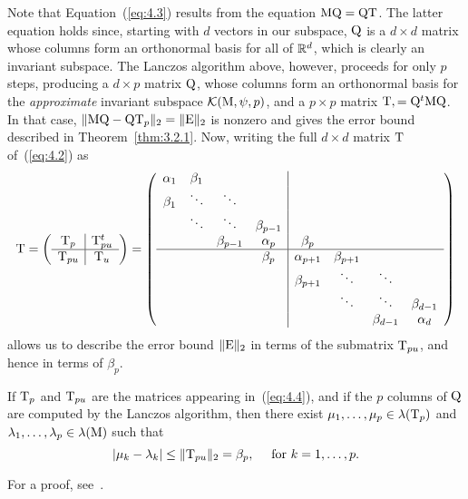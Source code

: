 Note that Equation~(\ref{eq:4.3}) results from the equation $\mathrm{M}\mathrm{Q} = \mathrm{Q}\mathrm{T}$. The latter equation holds
since, starting with $d$ vectors in our subspace, $\mathrm{Q}$ is a $d \times d$ matrix
whose columns form an orthonormal basis for all of $\mathbb{R}^d$, which is clearly an
invariant subspace. The Lanczos algorithm above, however, 
%
%
%
%
proceeds for only $p$ steps, producing a $d \times p$ matrix $\mathrm{Q}$, whose columns
form an orthonormal basis for the \emph{approximate} invariant subspace 
$\mathcal{K}(\mathrm{M}, \psi, p)$, and a $p \times p$ matrix $\mathrm{T}, = \mathrm{Q}^t\mathrm{M}\mathrm{Q}$. In that case,
$\|\mathrm{M}\mathrm{Q} - \mathrm{Q}\mathrm{T}_p\|_2 = \|\mathrm{E}\|_2$ is nonzero and gives the error bound described
in Theorem~\ref{thm:3.2.1}. Now, writing the full $d \times d$ matrix $\mathrm{T}$
of~(\ref{eq:4.2}) as
\begin{equation}
  \label{eq:4.4}
\mathrm{T} = 
\left( \begin{array}{c|c}
\mathrm{T}_p & \mathrm{T}_{pu}^t \\
 \hline
\mathrm{T}_{pu} & \mathrm{T}_{u}
\end{array}
\right)
=
\left( \begin{array}{cccc|cccc}
\alpha_1 & \beta_1 &      &                 & & && \\
\beta_1 & \ddots  & \ddots&                 & & && \\
        & \ddots  & \ddots  & \beta_{p-1}    &          & && \\
        &         & \beta_{p-1}  & \alpha_{p} & \beta_{p}& && \\
\hline
        &         &             & \beta_{p}  & \alpha_{p+1} & \beta_{p+1} && \\
        &         &             &           & \beta_{p+1}  & \ddots & \ddots &\\
        &         &             &           &             & \ddots & \ddots &\beta_{d-1} \\
        &         &             &           &             &        & \beta_{d-1} &\alpha_{d}
\end{array}
\right)
\end{equation}
allows us to describe the error bound $\|\mathrm{E}\|_2$ in terms of the submatrix
$\mathrm{T}_{pu}$, and hence in terms of $\beta_p$.
\begin{theorem}
\label{thm:4.1.1}
If $\mathrm{T}_p$ and $\mathrm{T}_{pu}$ are the matrices appearing in~(\ref{eq:4.4}), and if the $p$
columns of $\mathrm{Q}$ are computed by the 
Lanczos algorithm, then there exist $\mu_1, \dots, \mu_p \in \lambda(\mathrm{T}_p)$ and 
$\lambda_1, \dots, \lambda_p \in \lambda(\mathrm{M})$
such that
\[
|\mu_k - \lambda_k| \leq \|\mathrm{T}_{pu}\|_2 = \beta_p, \quad \text{ for $k=1,\dots,p$.}
\]
\end{theorem}
For a proof, see~\cite[Page 365]{Demmel:1997}.
%
%
%
%
